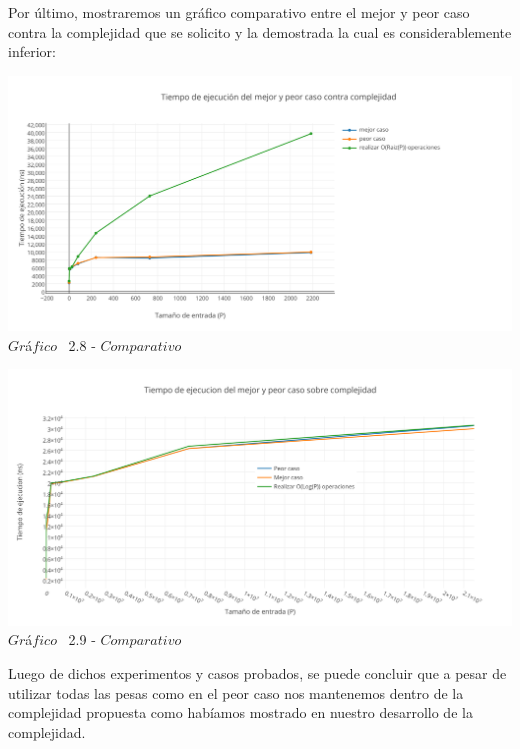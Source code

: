 Por \'ultimo, mostraremos un gr\'afico comparativo entre el mejor y peor caso contra la complejidad que se solicito y la demostrada la cual es considerablemente inferior:\\

\vspace*{0.3cm} \vspace*{0.3cm}
  \begin{center}
 \includegraphics[scale=0.65]{./EJ2/comparativo1.png}
 {$Gr$\'a$fico$ \ 2.8 - $Comparativo$}
  \end{center}
  \vspace*{0.3cm}
  
  \vspace*{0.3cm} \vspace*{0.3cm}
  \begin{center}
 \includegraphics[scale=0.65]{./EJ2/comparativo2.png}
 {$Gr$\'a$fico$ \ 2.9 - $Comparativo$}
  \end{center}
  \vspace*{0.3cm}

Luego de dichos experimentos y casos probados, se puede concluir que a pesar de utilizar todas las pesas como en el peor caso nos mantenemos dentro de la complejidad propuesta como hab\'iamos mostrado en nuestro desarrollo de la complejidad.\\
